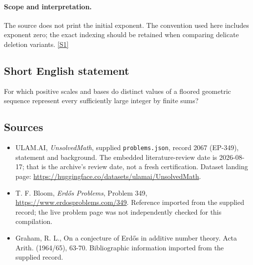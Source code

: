 \documentclass[11pt,a4paper]{article}
\newcommand{\sref}[2]{\hyperlink{source:#1:#2}{[S#2]}}
\begin{document}
\paragraph{Scope and interpretation.}

The source does not print the initial exponent. The convention used here includes exponent zero; the exact indexing should be retained when comparing delicate deletion variants. \sref{2067}{1}

\subsection{Short English statement}

For which positive scales and bases do distinct values of a floored geometric sequence represent every sufficiently large integer by finite sums?

\subsection{Sources}

{\small

\begin{itemize}

\item[\hypertarget{source:2067:1}{S1}] ULAM.AI, \emph{UnsolvedMath}, supplied \texttt{problems.json}, record 2067 (EP-349), statement and background. The embedded literature-review date is 2026-08-17; that is the archive’s review date, not a fresh certification. Dataset landing page: \url{https://huggingface.co/datasets/ulamai/UnsolvedMath}.

\item[\hypertarget{source:2067:2}{S2}] T. F. Bloom, \emph{Erdős Problems}, Problem 349, \url{https://www.erdosproblems.com/349}. Reference imported from the supplied record; the live problem page was not independently checked for this compilation.

\item[\hypertarget{source:2067:3}{S3}] Graham, R. L., On a conjecture of Erd\H{o}s in additive number theory. Acta Arith. (1964/65), 63-70. Bibliographic information imported from the supplied record.

\end{itemize}

}

\label{end:2067}
\end{document}
